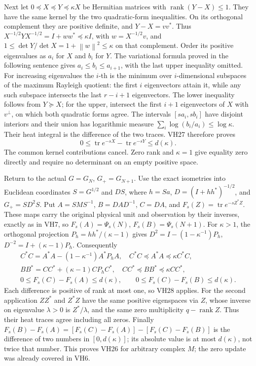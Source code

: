 \documentclass[11pt]{article}
\newcommand{\tr}{\operatorname{tr}}\newcommand{\norm}[1]{\left\lVert#1\right\rVert}
\begin{document}
Next let \(0\preceq X\preceq Y\preceq\kappa X\) be Hermitian
matrices with \(\operatorname{rank}(Y-X)\le1\). They have the same
kernel by the two quadratic-form inequalities. On its orthogonal
complement they are positive definite, and
\(Y-X=vv^*\). Thus
\(X^{-1/2}YX^{-1/2}=I+ww^*\preceq\kappa I\), with
\(w=X^{-1/2}v\), and
\(1\le\det Y/\det X=1+\norm w^2\le\kappa\) on that complement.
Order its positive eigenvalues as \(a_i\) for \(X\) and \(b_i\) for
\(Y\). The variational formula proved in the following sentence gives
\(a_i\le b_i\le a_{i+1}\), with the last upper inequality omitted.
For increasing eigenvalues the \(i\)-th is the minimum over
\(i\)-dimensional subspaces of the maximum Rayleigh quotient: the
first \(i\) eigenvectors attain it, while any such subspace intersects
the last \(r-i+1\) eigenvectors. The lower inequality follows from
\(Y\succeq X\); for the upper, intersect the first \(i+1\) eigenvectors
of \(X\) with \(v^\perp\), on which both quadratic forms agree.
The intervals \([sa_i,sb_i]\) have disjoint interiors and their union
has logarithmic measure \(\sum_i\log(b_i/a_i)\le\log\kappa\).
Their heat integral is the difference of the two traces. VH27 therefore
proves
\begin{equation}\tag{VH28}\label{VH28}
0\le\tr e^{-sX}-\tr e^{-sY}\le d(\kappa).
\end{equation}
The common kernel contributions cancel. Zero rank and \(\kappa=1\)
give equality zero directly and require no determinant on an empty
positive space.

Return to the actual \(G=G_N\), \(G_+=G_{N+1}\). Use the exact
isometries into Euclidean coordinates
\(S=G^{1/2}\) and \(DS\), where
\(h=Sa\), \(D=(I+hh^*)^{-1/2}\), and
\(G_+=S D^2 S\). Put \(A=SMS^{-1}\), \(B=DAD^{-1}\), \(C=DA\),
and \(F_s(Z)=\tr e^{-sZ^*Z}\). These maps carry the original physical
unit and observation by their inverses, exactly as in VH7, so
\(F_s(A)=\Psi_s(N)\), \(F_s(B)=\Psi_s(N+1)\).
For \(\kappa>1\), the orthogonal projection
\(P_h=hh^*/(\kappa-1)\) gives
\(D^2=I-(1-\kappa^{-1})P_h\), \(D^{-2}=I+(\kappa-1)P_h\).
Consequently
\begin{equation}\tag{VH29}\label{VH29}
\begin{gathered}
C^*C=A^*A-(1-\kappa^{-1})A^*P_hA,\quad
C^*C\preceq A^*A\preceq\kappa C^*C,\\
BB^*=CC^*+(\kappa-1)CP_hC^*,\quad
CC^*\preceq BB^*\preceq\kappa CC^*,\\
0\le F_s(C)-F_s(A)\le d(\kappa),\qquad
0\le F_s(C)-F_s(B)\le d(\kappa).
\end{gathered}
\end{equation}
Each difference is positive of rank at most one, so VH28 applies.
For the second application \(ZZ^*\) and \(Z^*Z\) have the same
positive eigenspaces via \(Z\), whose inverse on eigenvalue \(\lambda>0\)
is \(Z^*/\lambda\), and the same zero multiplicity \(q-\operatorname{rank}Z\).
Thus their heat traces agree including all zeros. Finally
\(F_s(B)-F_s(A)=[F_s(C)-F_s(A)]-[F_s(C)-F_s(B)]\) is the difference
of two numbers in \([0,d(\kappa)]\); its absolute value is at most
\(d(\kappa)\), not twice that number. This proves VH26 for arbitrary
complex \(M\); the zero update was already covered in VH6.
\end{document}
